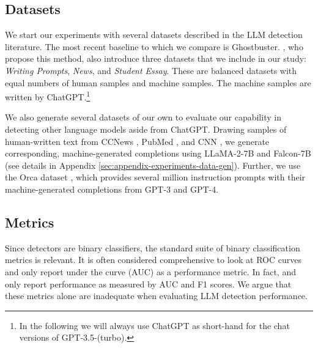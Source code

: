 \documentclass{article} %
\begin{document}
\subsection{Datasets}
\label{sec:data}

We start our experiments with several datasets described in the LLM detection literature. 
The most recent baseline to which we compare is Ghostbuster. 
\citet{verma_ghostbuster_2023}, who propose this method, also introduce three datasets that we include in our study: \textit{Writing Prompts}, \textit{News}, and \textit{Student Essay}.
These are balanced datasets with equal numbers of human samples and machine samples. The machine samples are written by ChatGPT.\footnote{In the following we will always use ChatGPT as short-hand for the chat versions of GPT-3.5-(turbo).}

We also generate several datasets of our own to evaluate our capability in detecting other language models aside from ChatGPT. Drawing samples of human-written text from CCNews \citep{Hamborg2017}, PubMed \citep{sen_collective_2008}, and {CNN} \citep{hermann_teaching_2015}, we generate corresponding, machine-generated completions using LLaMA-2-7B and Falcon-7B (see details in Appendix \ref{sec:appendix-experiments-data-gen}). 
Further, we use the Orca dataset \citep{OpenOrca}, which provides several million instruction prompts with their machine-generated completions from GPT-3 and GPT-4. 


\subsection{Metrics}
\label{sec:metrics}

Since detectors are binary classifiers, the standard suite of binary classification metrics is relevant. It is often considered comprehensive to look at ROC curves and only report under the curve (AUC) as a performance metric.
In fact, \citet{verma_ghostbuster_2023} and \citet{mitchell_detectgpt_2023} only report performance as measured by AUC and F1 scores. We argue that these metrics alone are inadequate when evaluating LLM detection performance.

\end{document}
